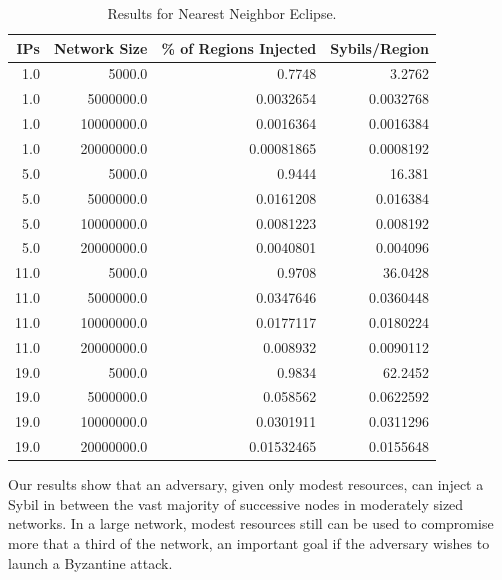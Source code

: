 \documentclass[11pt,conference]{IEEEtran}
\begin{document}
\begin{table}[h]\small
	\centering
       \caption{Results for Nearest Neighbor Eclipse.}  %
       \label{tab:exp2}
\begin{tabular}{|r|r|r|r|}
    \hline
    IPs & Network Size & \% of Regions Injected & Sybils/Region \\ \hline
1.0 & 5000.0 & 0.7748 & 3.2762 \\ \hline
1.0 & 5000000.0 & 0.0032654 & 0.0032768 \\ \hline
1.0 & 10000000.0 & 0.0016364 & 0.0016384 \\ \hline
1.0 & 20000000.0 & 0.00081865 & 0.0008192 \\ \hline
5.0 & 5000.0 & 0.9444 & 16.381 \\ \hline
5.0 & 5000000.0 & 0.0161208 & 0.016384 \\ \hline
5.0 & 10000000.0 & 0.0081223 & 0.008192 \\ \hline
5.0 & 20000000.0 & 0.0040801 & 0.004096 \\ \hline
11.0 & 5000.0 & 0.9708 & 36.0428 \\ \hline
11.0 & 5000000.0 & 0.0347646 & 0.0360448 \\ \hline
11.0 & 10000000.0 & 0.0177117 & 0.0180224 \\ \hline
11.0 & 20000000.0 & 0.008932 & 0.0090112 \\ \hline
19.0 & 5000.0 & 0.9834 & 62.2452 \\ \hline
19.0 & 5000000.0 & 0.058562 & 0.0622592 \\ \hline
19.0 & 10000000.0 & 0.0301911 & 0.0311296 \\ \hline
19.0 & 20000000.0 & 0.01532465 & 0.0155648 \\ \hline
\end{tabular}


\end{table}

Our results show that an adversary, given only modest resources, can inject a Sybil in between the vast majority of successive nodes in moderately sized networks.
In a large network, modest resources still can be used to compromise more that a third of the network, an  important goal if the adversary  wishes to launch a Byzantine attack.
\end{document}
